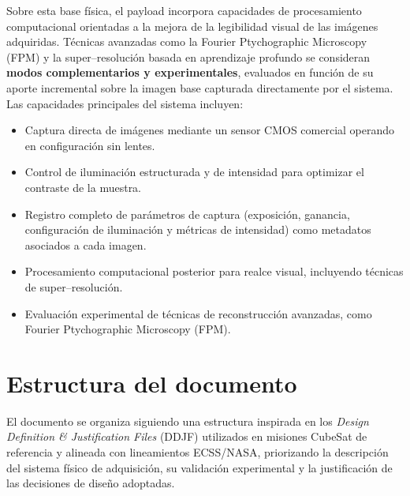 Sobre esta base física, el payload incorpora capacidades de procesamiento
computacional orientadas a la mejora de la legibilidad visual de las imágenes
adquiridas. Técnicas avanzadas como la Fourier Ptychographic Microscopy (FPM) y
la super--resolución basada en aprendizaje profundo se consideran
\textbf{modos complementarios y experimentales}, evaluados en función de su
aporte incremental sobre la imagen base capturada directamente por el sistema.
Las capacidades principales del sistema incluyen:

\begin{itemize}
    \item Captura directa de imágenes mediante un sensor CMOS comercial
    operando en configuración sin lentes.
    \item Control de iluminación estructurada y de intensidad para optimizar el
    contraste de la muestra.
    \item Registro completo de parámetros de captura (exposición, ganancia,
    configuración de iluminación y métricas de intensidad) como metadatos
    asociados a cada imagen.
    \item Procesamiento computacional posterior para realce visual, incluyendo
    técnicas de super--resolución.
    \item Evaluación experimental de técnicas de reconstrucción avanzadas,
    como Fourier Ptychographic Microscopy (FPM).
\end{itemize}
\section{Estructura del documento}

El documento se organiza siguiendo una estructura inspirada en los
\emph{Design Definition \& Justification Files} (DDJF) utilizados en misiones
CubeSat de referencia y alineada con lineamientos ECSS/NASA, priorizando la
descripción del sistema físico de adquisición, su validación experimental y la
justificación de las decisiones de diseño adoptadas.


